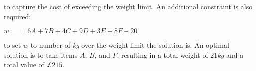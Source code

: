 \documentclass[11pt]{article} %
\begin{document}
to capture the cost of exceeding the weight limit. An additional constraint is also required:

\begin{center}

$w == 6A + 7B + 4C + 9D + 3E + 8F - 20$

\end{center}

to set $w$ to number of \textit{kg} over the weight limit the solution is.
An optimal solution is to take items $A$, $B$, and $F$, resulting in a total weight of $21$\textit{kg} and a total value of \textit{£}$215$.
\end{document}
